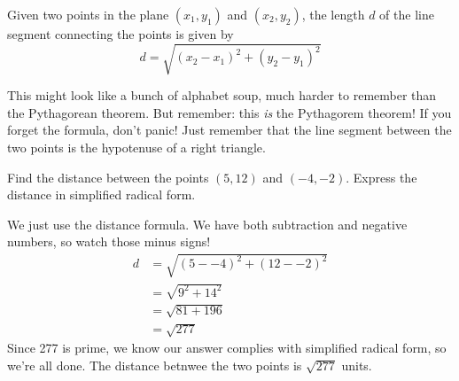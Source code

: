 \begin{center}
\end{center}

\begin{boxeddef}
Given two points in the plane $(x_1, y_1)$ and $(x_2, y_2)$, the length $d$ of the line segment connecting the points is given by
\[d = \sqrt{ (x_2 - x_1)^2 + (y_2 - y_1)^2 }\]
\end{boxeddef}

This might look like a bunch of alphabet soup, much harder to remember than the Pythagorean theorem. But remember: this \textit{is} the Pythagorem theorem! If you forget the formula, don't panic! Just remember that the line segment between the two points is the hypotenuse of a right triangle.

\begin{boxedex}
Find the distance between the points $(5, 12)$ and $(-4, -2)$. Express the distance in simplified radical form.

 We just use the distance formula. We have both subtraction and negative numbers, so watch those minus signs! \[\begin{aligned} d &= \sqrt{ (5 - -4)^2 + (12 - -2)^2 } \\ &= \sqrt{ 9^2 + 14^2 } \\ &=\sqrt{ 81 + 196 } \\ &=\sqrt{ 277 }\end{aligned}\] Since 277 is prime, we know our answer complies with simplified radical form, so we're all done. The distance betnwee the two points is $\sqrt{277}$ units.
\end{boxedex}

